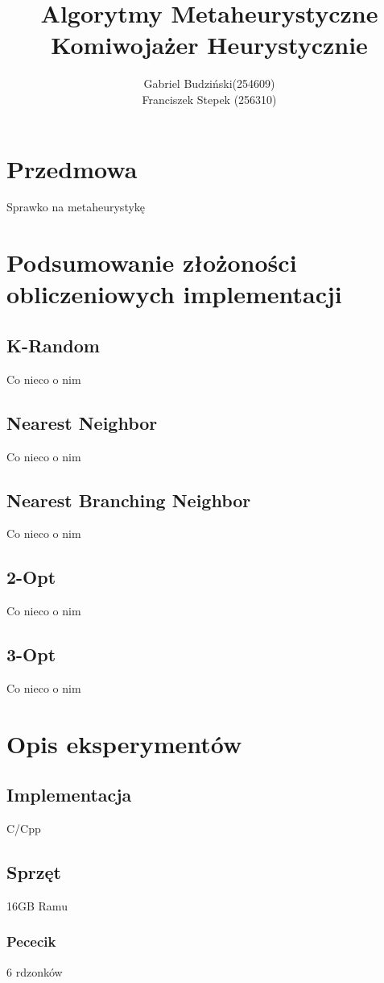 \documentclass{article}
\title{\textbf{Algorytmy Metaheurystyczne\\Komiwojażer Heurystycznie}}
\author{Gabriel Budziński(254609)\\Franciszek Stepek (256310)}
\date{}
\begin{document}
 
\maketitle

\section*{Przedmowa}
Sprawko na metaheurystykę

\section{Podsumowanie złożoności obliczeniowych implementacji}
\subsection{K-Random}
Co nieco o nim

\subsection{Nearest Neighbor}
Co nieco o nim

\subsection{Nearest Branching Neighbor}
Co nieco o nim

\subsection{2-Opt}
Co nieco o nim

\subsection{3-Opt}
Co nieco o nim

\section{Opis eksperymentów}
\subsection{Implementacja}
C/Cpp

\subsection{Sprzęt}
16GB Ramu

\subsubsection{Pececik}
6 rdzonków
\end{document}
